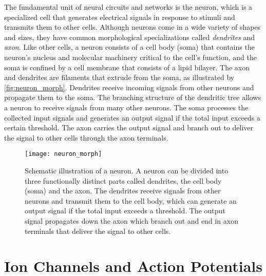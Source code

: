 The fundamental unit of neural circuits and networks is the neuron, which is a specialized cell that generates electrical signals in response to stimuli and transmits them to other cells. Although neurons come in a wide variety of shapes and sizes, they have common morphological specializations called \textit{dendrites} and \textit{axon}. Like other cells, a neuron consists of a cell body (soma) that contains the neuron's nucleus and molecular machinery critical to the cell's function, and the soma is confined by a cell membrane that consists of a lipid bilayer. The axon and dendrites are filaments that extrude from the soma, as illustrated by \autoref{fig:neuron_morph}. Dendrites receive incoming signals from other neurons and propagate them to the soma. The branching structure of the dendritic tree allows a neuron to receive signals from many other neurons. The soma processes the collected input signals and generates an output signal if the total input exceeds a certain threshold. The axon carries the output signal and branch out to deliver the signal to other cells through the axon terminals. 


\begin{figure}[!htb]
    \centering
    \texttt{[image: neuron\_morph]}
    \caption{Schematic illustration of a neuron. A neuron can be divided into three functionally distinct parts called dendrites, the cell body (soma) and the axon. The dendrites receive signals from other neurons and transmit them to the cell body, which can generate an output signal if the total input exceeds a threshold. The output signal propagates down the axon which branch out and end in axon terminals that deliver the signal to other cells.
    }
    \label{fig:neuron_morph}
\end{figure}


\section{Ion Channels and Action Potentials}

